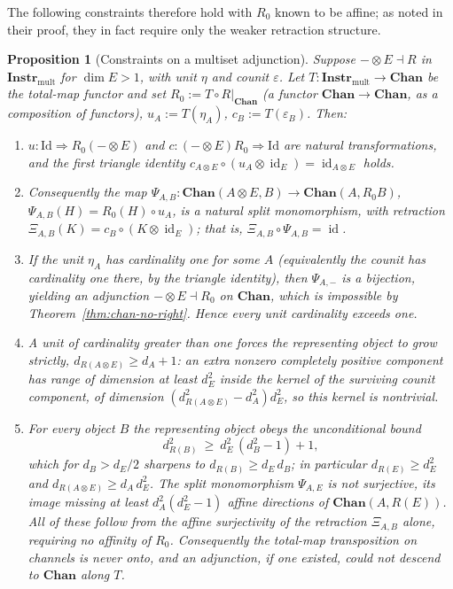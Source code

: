 \documentclass[11pt]{article}
\newtheorem{proposition}[theorem]{Proposition}
\DeclareMathOperator{\id}{id}
\begin{document}
The following constraints therefore hold with $R_0$ known to be affine; as noted
in their proof, they in fact require only the weaker retraction structure.

\begin{proposition}[Constraints on a multiset adjunction]
\label{prop:multiset-constraints}
Suppose $-\otimes E\dashv R$ in $\mathbf{Instr}_{\mathrm{mult}}$ for $\dim E>1$,
with unit $\eta$ and counit $\varepsilon$. Let
$T:\mathbf{Instr}_{\mathrm{mult}}\to\mathbf{Chan}$ be the total-map functor and
set $R_0:=T\circ R|_{\mathbf{Chan}}$ (a functor $\mathbf{Chan}\to\mathbf{Chan}$,
as a composition of functors), $u_A:=T(\eta_A)$, $c_B:=T(\varepsilon_B)$. Then:
\begin{enumerate}
\item $u:\mathrm{Id}\Rightarrow R_0(-\otimes E)$ and $c:(-\otimes E)R_0\Rightarrow\mathrm{Id}$
are natural transformations, and the first triangle identity
$c_{A\otimes E}\circ(u_A\otimes\id_E)=\id_{A\otimes E}$ holds.
\item Consequently the map
$\Psi_{A,B}:\mathbf{Chan}(A\otimes E,B)\to\mathbf{Chan}(A,R_0B)$,
$\Psi_{A,B}(H)=R_0(H)\circ u_A$, is a natural split monomorphism, with retraction
$\Xi_{A,B}(K)=c_B\circ(K\otimes\id_E)$; that is, $\Xi_{A,B}\circ\Psi_{A,B}=\id$.
\item If the unit $\eta_A$ has cardinality one for some $A$ (equivalently the
counit has cardinality one there, by the triangle identity), then $\Psi_{A,-}$
is a bijection, yielding an adjunction $-\otimes E\dashv R_0$ on $\mathbf{Chan}$,
which is impossible by Theorem~\ref{thm:chan-no-right}. Hence every unit
cardinality exceeds one.
\item A unit of cardinality greater than one forces the representing object to
grow strictly, $d_{R(A\otimes E)}\ge d_A+1$: an extra nonzero completely
positive component has range of dimension at least $d_E^2$ inside the kernel of
the surviving counit component, of dimension
$(d_{R(A\otimes E)}^2-d_A^2)d_E^2$, so this kernel is nontrivial.
\item For every object $B$ the representing object obeys the unconditional bound
\[
d_{R(B)}^2\ \ge\ d_E^2\,(d_B^2-1)+1,
\]
which for $d_B>d_E/2$ sharpens to $d_{R(B)}\ge d_E\,d_B$; in particular
$d_{R(E)}\ge d_E^2$ and $d_{R(A\otimes E)}\ge d_A\,d_E^2$. The split
monomorphism $\Psi_{A,E}$ is not surjective, its image missing at least
$d_A^2(d_E^2-1)$ affine directions of $\mathbf{Chan}(A,R(E))$. All of these
follow from the affine surjectivity of the retraction $\Xi_{A,B}$ alone,
requiring no affinity of $R_0$. Consequently the total-map transposition on
channels is never onto, and an adjunction, if one existed, could not descend to
$\mathbf{Chan}$ along $T$.
\end{enumerate}
\end{proposition}
\end{document}
